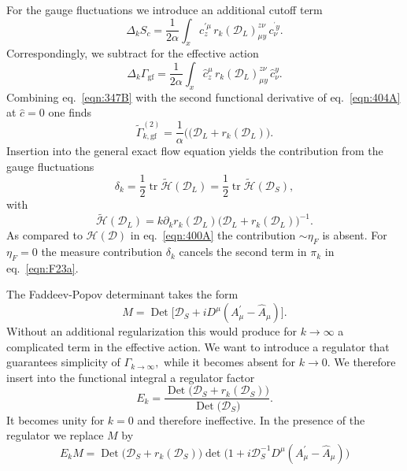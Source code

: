 \documentclass[twocolumn,aps,prd,amsmath,amssymb,preprintnumbers,longbibliography]{revtex4-1}
\numberwithin{equation}{section}
\DeclareMathOperator{\tr}{tr}
\DeclareMathOperator{\Det}{Det}
\begin{document}
For the gauge fluctuations we introduce an additional cutoff term
\begin{equation}\label{eqn:F24a}
	\Delta_k S_c
	= \frac{1}{2 \alpha} \int_x c_z^{\prime\mu} \, r_k(\mathcal{D}_L)_{\mu y}^{z \nu} \, c_\nu^{^\prime y}.
\end{equation}
Correspondingly, we subtract for the effective action
\begin{equation}\label{eqn:404A}
	\Delta_k\Gamma_\text{gf}
	= \frac{1}{2 \alpha} \int_x \hat{c}_z^\mu \, r_k(\mathcal{D}_L)_{\mu y}^{z \nu} \, \hat{c}_\nu^y.
\end{equation}
Combining eq.~\eqref{eqn:347B} with the second functional derivative of eq.~\eqref{eqn:404A} at $\hat{c} = 0$ one finds
\begin{equation}\label{eqn:F25a}
	\tilde\Gamma^{(2)}_{k,\text{gf}}
	= \frac{1}{\alpha}\bigl((\mathcal{D}_L + r_k(\mathcal{D}_L)\bigr).
\end{equation}
Insertion into the general exact flow equation \cite{CWFE} yields the contribution from the gauge fluctuations
\begin{equation}\label{eqn:405A}
	\delta_k
	= \frac{1}{2}\tr\tilde{\mathcal{H}}(\mathcal{D}_L)
	= \frac{1}{2}\tr\tilde{\mathcal{H}}(\mathcal{D}_S),
\end{equation}
with
\begin{equation}\label{eqn:405B}
	\tilde{\mathcal{H}}(\mathcal{D}_L)
	= k\partial_k r_k(\mathcal{D}_L)\bigl(\mathcal{D}_L + r_k(\mathcal{D}_L)\bigr)^{-1}.
\end{equation}
As compared to $\mathcal{H}(\mathcal{D})$ in eq.~\eqref{eqn:400A} the contribution $\sim \eta_F$ is absent. For $\eta_F = 0$ the measure contribution $\delta_k$ cancels the second term in $\pi_k$ in eq.~\eqref{eqn:F23a}.

The Faddeev-Popov determinant takes the form
\begin{equation}\label{eqn:449A}
	M
	= \Det\bigl[\mathcal{D}_S + iD^\mu(A_\mu^\prime - \hat{A}_\mu)\bigr].
\end{equation}
Without an additional regularization this would produce for $k\rightarrow\infty$ a complicated term in the effective action. We want to introduce a regulator that guarantees simplicity of $\Gamma_{k\rightarrow\infty},$ while it becomes absent for $k\rightarrow 0$. We therefore insert into the functional integral a regulator factor \cite{RW}
\begin{equation}\label{eqn:405C}
	E_k
	= \frac{\Det\bigl(\mathcal{D}_S + r_k(\mathcal{D}_S)\bigr)}{\Det\bigl(\mathcal{D}_S\bigr)}.
\end{equation}
It becomes unity for $k = 0$ and therefore ineffective. In the presence of the regulator we replace $M$ by
\begin{equation}\label{eqn:451}
	E_k M
	= \Det\bigl(\mathcal{D}_S + r_k(\mathcal{D}_S)\bigr){\det}\bigl(1 + i\mathcal{D}_S^{-1}D^\mu(A_\mu^\prime - \hat{A}_\mu)\bigr)
\end{equation}
\end{document}
